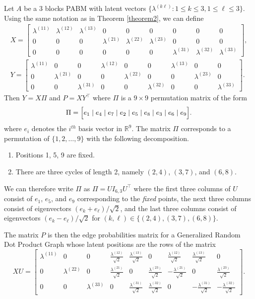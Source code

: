 \documentclass[12pt]{article}
\begin{document}
\begin{example} Let $A$ be a $3$ blocks PABM with latent vectors
  $\{\lambda^{(k \ell)} \colon 1 \leq k \leq 3, 1 \leq \ell \leq 3\}$. Using the same notation as in Theorem
  \ref{theorem2}, we can define
\begin{gather*}
X = \begin{bmatrix}
\lambda^{(11)} & \lambda^{(12)} & \lambda^{(13)} & 0 & 0 & 0 & 0 & 0 & 0 \\
0 & 0 & 0 & \lambda^{(21)} & \lambda^{(22)} & \lambda^{(23)} & 0 & 0 & 0 \\
0 & 0 & 0 & 0 & 0 & 0 & \lambda^{(31)} & \lambda^{(32)} & \lambda^{(33)}
\end{bmatrix}, \\
Y = \begin{bmatrix}
\lambda^{(11)} & 0 & 0 & \lambda^{(12)} & 0 & 0 & \lambda^{(13)} & 0 & 0 \\
0 & \lambda^{(21)} & 0 & 0 & \lambda^{(22)} & 0 & 0 & \lambda^{(23)} & 0 \\
0 & 0 & \lambda^{(31)} & 0 & 0 & \lambda^{(32)} & 0 & 0 & \lambda^{(33)}
\end{bmatrix}.
\end{gather*}
Then $Y = X \Pi$ and $P = X Y^{\top}$ where $\Pi$ is a $9 \times 9$ 
permutation matrix of the form
$$\Pi = 
\Bigl[e_1 \mid e_4 \mid e_7 \mid e_2 \mid e_5 \mid e_8 \mid e_3
\mid e_6 \mid e_9 \Bigr].$$
where $e_i$ denotes the $i^{th}$ basis vector in $\mathbb{R}^{9}$. 
The matrix $\Pi$ corresponds to a permutation of $\{1,2,\dots,9\}$
with the following decomposition.
\begin{enumerate}
\item Positions 1, 5, 9 are fixed.
\item There are three cycles of length 2, namely $(2, 4)$, $(3, 7)$, and $(6, 8)$.
\end{enumerate}
We can therefore write $\Pi$ as $\Pi = U I_{6, 3} U^\top$ where the first three
columns of $U$ consist of $e_1$, $e_5$, and $e_9$ corresponding to the
{\em fixed} points, the next three columns consist of eigenvectors
$(e_k + e_{\ell}) / \sqrt{2}$, and the last three columns consist of eigenvectors
$(e_k - e_{\ell}) / \sqrt{2}$ for $(k, \ell) \in
\{(2,4),(3,7),(6,8)\}$.

The matrix $P$ is then the edge probabilities matrix for a 
Generalized Random Dot Product Graph whose latent positions 
are the rows of the matrix
$$XU = \begin{bmatrix}
  \lambda^{(11)} & 0 & 0 &
  \frac{\lambda^{(12)}}{\sqrt{2}} & \frac{\lambda^{(13)}}{\sqrt{2}} & 0 &
  \frac{\lambda^{(12)}}{\sqrt{2}} & \frac{\lambda^{(13)}}{\sqrt{2}} & 0 \\
  0 & \lambda^{(22)} & 0 &
  \frac{\lambda^{(21)}}{\sqrt{2}} & 0 & \frac{\lambda^{(23)}}{\sqrt{2}} &
  -\frac{\lambda^{(21)}}{\sqrt{2}} & 0 & \frac{\lambda^{(23)}}{\sqrt{2}} \\
  0 & 0 & \lambda^{(33)} &
  0 & \frac{\lambda^{(31)}}{\sqrt{2}} & \frac{\lambda^{(32)}}{\sqrt{2}} &
  0 & -\frac{\lambda^{(31)}}{\sqrt{2}} & -\frac{\lambda^{(32)}}{\sqrt{2}}
\end{bmatrix}.$$
\end{example}
\end{document}

